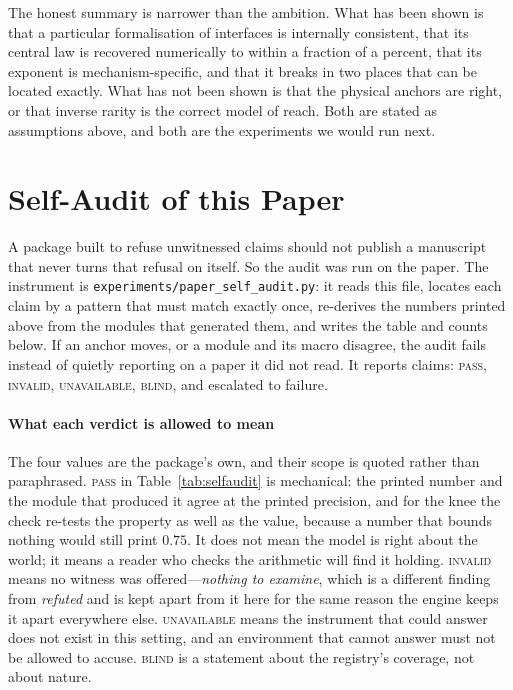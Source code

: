 \documentclass[conference]{IEEEtran}
\theoremstyle{definition}
\begin{document}
The honest summary is narrower than the ambition. What has been shown is that a
particular formalisation of interfaces is internally consistent, that its central
law is recovered numerically to within a fraction of a percent, that its exponent
is mechanism-specific, and that it breaks in two places that can be located
exactly. What has not been shown is that the physical anchors are right, or that
inverse rarity is the correct model of reach. Both are stated as assumptions above,
and both are the experiments we would run next.

\clearpage
\appendices
\section{Self-Audit of this Paper}
\label{app:selfaudit}

A package built to refuse unwitnessed claims should not publish a manuscript that
never turns that refusal on itself. So the audit was run on the paper. The
instrument is \texttt{experiments/paper\_self\_audit.py}: it reads this file,
locates each claim by a pattern that must match exactly once, re-derives the
numbers printed above from the modules that generated them, and writes the table
and counts below. If an anchor moves, or a module and its macro disagree, the audit
fails instead of quietly reporting on a paper it did not read. It reports
\saClaimCount{} claims: \saPassCount{} \textsc{pass}, \saInvalidCount{}
\textsc{invalid}, \saUnavailableCount{} \textsc{unavailable}, \saBlindCount{}
\textsc{blind}, and \saFailCount{} escalated to failure.

\paragraph{What each verdict is allowed to mean} The four values are the package's
own, and their scope is quoted rather than paraphrased. \textsc{pass} in
Table~\ref{tab:selfaudit} is mechanical: the printed number and the module that
produced it agree at the printed precision, and for the knee the check re-tests the
property as well as the value, because a number that bounds nothing would still
print $0.75$. It does not mean the model is right about the world; it means a
reader who checks the arithmetic will find it holding. \textsc{invalid} means no
witness was offered---\emph{nothing to examine}, which is a different finding from
\emph{refuted} and is kept apart from it here for the same reason the engine keeps
it apart everywhere else. \textsc{unavailable} means the instrument that could
answer does not exist in this setting, and an environment that cannot answer must
not be allowed to accuse. \textsc{blind} is a statement about the registry's
coverage, not about nature.
\end{document}
